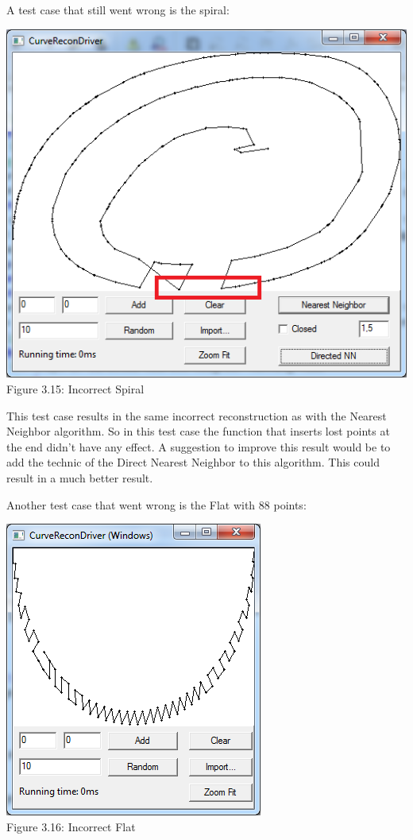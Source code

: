     \noindent A test case that still went wrong is the spiral: \\
          \begin{center}
            \includegraphics[scale = 0.6]{3ImprovedNearestNeighbor/innSpiral.png}\\
            Figure 3.15: Incorrect Spiral
            \label{fig:inn_pointcircle}
          \end{center}

  \noindent This test case results in the same incorrect reconstruction as with the Nearest Neighbor algorithm. So in this test case the function that inserts lost points at the end didn't have any effect. A suggestion to improve this result would be to add the technic of the Direct Nearest Neighbor to this algorithm. This could result in a much better result.

  \noindent Another test case that went wrong is the Flat with 88 points:\\

            \begin{center}
            \includegraphics[scale = 0.7]{3ImprovedNearestNeighbor/innFlat.png}\\
            Figure 3.16: Incorrect Flat
            \label{fig:inn_pointcircle}
          \end{center}

